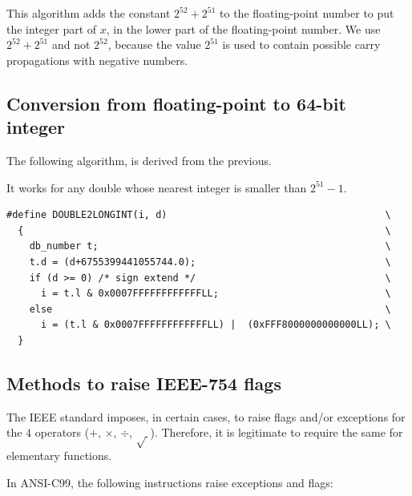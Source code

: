 This algorithm adds the constant $2^{52}+2^{51}$ to the floating-point
number to put the integer part of $x$, in the lower part of the
floating-point number.  We use $2^{52}+2^{51}$ and not $2^{52}$,
because the value $2^{51}$ is used to contain possible carry
propagations with negative numbers.


\subsection{Conversion from floating-point to 64-bit integer \label{sec:double2longint}}

\begin{theorem}
  The following algorithm, is derived from the previous.

  It works for any double whose nearest integer is smaller than $2^{51} -1$.

\begin{lstlisting}[label={chap0:lst:conversion3},caption={Conversion from FP to long long int},firstnumber=1]
#define DOUBLE2LONGINT(i, d)                                      \
  {                                                               \
    db_number t;                                                  \
    t.d = (d+6755399441055744.0);                                 \
    if (d >= 0) /* sign extend */                                 \
      i = t.l & 0x0007FFFFFFFFFFFFLL;                             \
    else                                                          \
      i = (t.l & 0x0007FFFFFFFFFFFFLL) |  (0xFFF8000000000000LL); \
  }
\end{lstlisting}

\end{theorem}




\subsection{Methods to raise IEEE-754 flags}

The IEEE standard imposes, in certain cases, to raise flags and/or
exceptions for the $4$ operators ($+$, $\times$, $\div$, $\sqrt{~}$).
Therefore, it is legitimate to require the same for elementary
functions.

In ANSI-C99, the following instructions raise exceptions and
flags:

